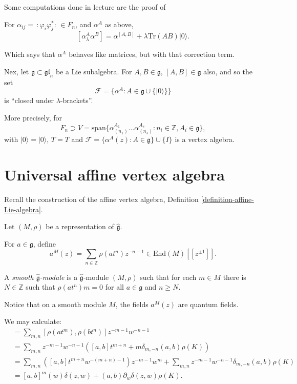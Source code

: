 Some computations done in lecture are the proof of

\begin{theorem}
\label{theorem-alpha-is-like-matrices}
For $\alpha_{ij}=\,:\!\varphi_i \varphi_j^*\!:\, \in F_n$,
and $\alpha^A$ as above,
$$
[\alpha^A_\lambda\alpha^B]=\alpha^{[A,B]}
+\lambda\text{Tr}(AB)|0\rangle.
$$
\end{theorem}

Which says that $\alpha^A$ behaves like matrices,
but with that correction term.

\medskip\noindent
Nex, let $\mathfrak{g}\subset \mathfrak{gl}_n$ 
be a Lie subalgebra.
For $A,B \in \mathfrak{g}$, $[A,B] \in \mathfrak{g}$ 
also, and so the set
$$
\mathcal{F}=\{\alpha^A:A \in \mathfrak{g} \cup \{|0\rangle\}\}
$$
is ``closed under $\lambda$-brackets''.

More precisely, for
$$
F_n \supset V=\text{span}\{\alpha^{A_1}_{(n_1)}\ldots\alpha^{A_s}_{(n_s)}:
n_i \in \mathbb{Z}, A_i \in \mathfrak{g}\},
$$
with $|0\rangle=|0\rangle$, $T=T$ and
$\mathcal{F}=\{\alpha^A(z):A \in \mathfrak{g}\}\cup \{I\}$ 
is a vertex algebra.

\section{Universal affine vertex algebra}
\label{section-universal-affine-vertex-algebra}

Recall the construction of the affine vertex algebra,
Definition \ref{definition-affine-Lie-algebra}.

Let $(M,\rho)$ be a representation of $\hat{\mathfrak{g}}$.

For $a \in \mathfrak{g}$, define
\begin{equation}
\label{equation-quantum-fields-for-universal-vertex-algebra}
a^M(z)=\sum_{n \in \mathbb{Z}}\rho(at^n)z^{-n-1}
\in\text{End}(M)[\![z^{\pm 1}]\!].
\end{equation}
\begin{definition}
\label{definition-smooth-g-module}
A {\it smooth $\hat{\mathfrak{g}}$-module}
is a $\hat{\mathfrak{g}}$-module $(M,\rho)$ 
such that for each $m \in M$ there is $N \in \mathbb{Z}$ 
such that $\rho(at^n)m=0$ for all
$a \in \mathfrak{g}$ and $n \geq N$.
\end{definition}

Notice that on a smooth module $M$,
the fields $a^M(z)$ are quantum fields.

We may calculate:
\begin{align*}
[a^m(z),b^m(w)]&=\sum_{m,n}[\rho(at^m),\rho(bt^n)]z^{-m-1}w^{-n-1}\\
&=\sum_{m,n}z^{-m-1}w^{-n-1}
([a,b]t^{m+n}+m\delta_{m,-n}(a,b)\rho(K))\\
&=\sum_{m,n}([a,b]t^{m+n}w^{-(m+n)-1})z^{-m-1}w^m
+\sum_{m,n}z^{-m-1}w^{-n-1}\delta_{m,-n}(a,b)\rho(K)\\
&=[a,b]^m(w)\delta(z,w)
+(a,b)\partial_w\delta(z,w)\rho(K).
\end{align*}

